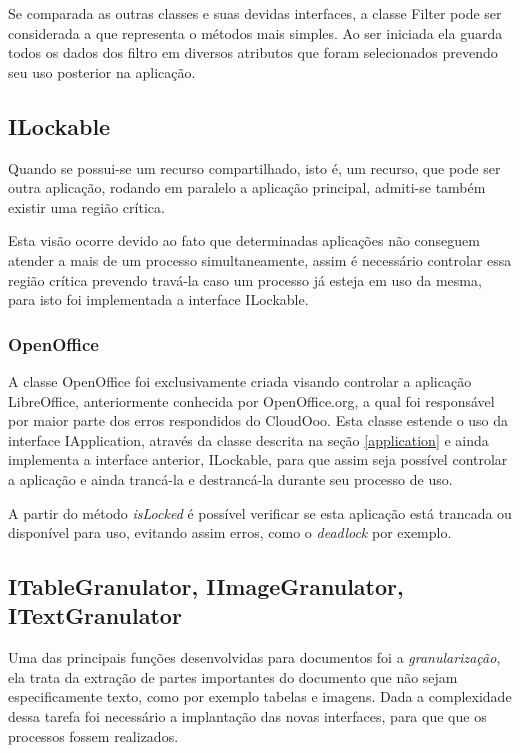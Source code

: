 Se comparada as outras classes e suas devidas interfaces, a classe Filter pode ser considerada a que representa o métodos mais simples. Ao ser iniciada ela guarda todos os dados dos filtro em diversos atributos que foram selecionados prevendo seu uso posterior na aplicação.

\subsection{ILockable}

Quando se possui-se um recurso compartilhado, isto é, um recurso, que pode ser outra aplicação, rodando em paralelo a aplicação principal, admiti-se também existir uma região crítica.

Esta visão ocorre devido ao fato que determinadas aplicações não conseguem atender a mais de um processo simultaneamente, assim é necessário controlar essa região crítica prevendo travá-la caso um processo já esteja em uso da mesma, para isto foi implementada a interface ILockable.

\subsubsection{OpenOffice}

A classe OpenOffice foi exclusivamente criada visando controlar a aplicação LibreOffice, anteriormente conhecida por OpenOffice.org, a qual foi responsável por maior parte dos erros respondidos do CloudOoo. Esta classe estende o uso da interface IApplication, através da classe descrita na seção \ref{application} e ainda implementa a interface anterior, ILockable, para que assim seja possível controlar a aplicação e ainda trancá-la e destrancá-la durante seu processo de uso.

A partir do método \textit{isLocked} é possível verificar se esta aplicação está trancada ou disponível para uso, evitando assim erros, como o \textit{deadlock} por exemplo.

\subsection{ITableGranulator, IImageGranulator, ITextGranulator}

Uma das principais funções desenvolvidas para documentos foi a \textit{granularização}, ela trata da extração de partes importantes do documento que não sejam especificamente texto, como por exemplo tabelas e imagens. Dada a complexidade dessa tarefa foi necessário a implantação das novas interfaces, para que que os processos fossem realizados.

